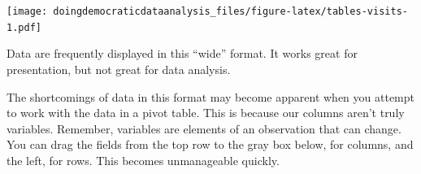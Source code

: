 \documentclass[
]{book}
\newenvironment{Shaded}{\begin{snugshade}}{\end{snugshade}}
\newcommand{\CommentTok}[1]{\textcolor[rgb]{0.56,0.35,0.01}{\textit{#1}}}
\newcommand{\DataTypeTok}[1]{\textcolor[rgb]{0.13,0.29,0.53}{#1}}
\newcommand{\DecValTok}[1]{\textcolor[rgb]{0.00,0.00,0.81}{#1}}
\newcommand{\KeywordTok}[1]{\textcolor[rgb]{0.13,0.29,0.53}{\textbf{#1}}}
\newcommand{\NormalTok}[1]{#1}
\newcommand{\OperatorTok}[1]{\textcolor[rgb]{0.81,0.36,0.00}{\textbf{#1}}}
\newcommand{\OtherTok}[1]{\textcolor[rgb]{0.56,0.35,0.01}{#1}}
\newcommand{\StringTok}[1]{\textcolor[rgb]{0.31,0.60,0.02}{#1}}
\begin{document}
\begin{Shaded}
\end{Shaded}

\texttt{[image: doingdemocraticdataanalysis\_files/figure-latex/tables-visits-1.pdf]}

Data are frequently displayed in this ``wide'' format. It works great for presentation, but not great for data analysis.

The shortcomings of data in this format may become apparent when you attempt to work with the data in a pivot table. This is because our columns aren't truly variables. Remember, variables are elements of an observation that can change. You can drag the fields from the top row to the gray box below, for columns, and the left, for rows. This becomes unmanageable quickly.

\begin{Shaded}
\end{Shaded}
\end{document}
